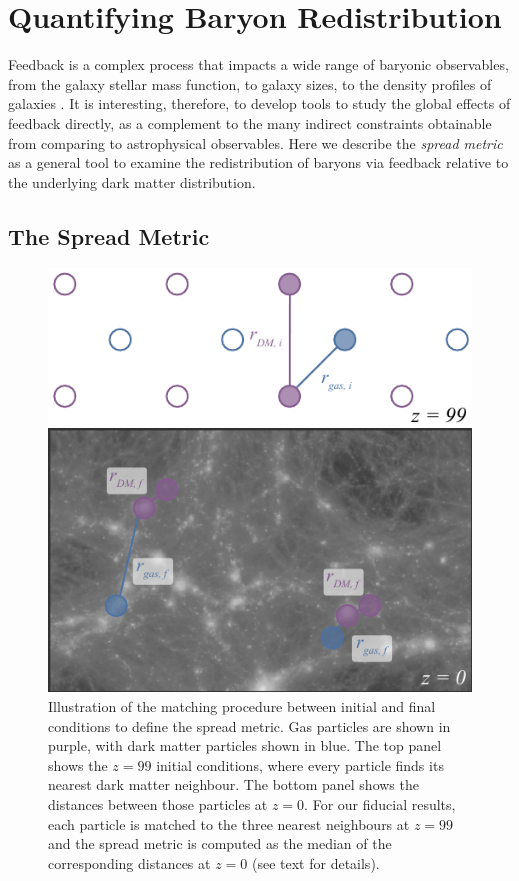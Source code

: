 \section{Quantifying Baryon Redistribution}
\label{sec:feedbackmetrics}

Feedback is a complex process that impacts a wide range of baryonic
observables, from the galaxy stellar mass function, to galaxy sizes, to the
density profiles of galaxies \citep[e.g.][]{Angles-Alcazar2014, Nelson2015,
Hellwing2016, BenitezLlambay2018}. It is interesting, therefore, to develop
tools to study the global effects of feedback directly, as a complement to
the many indirect constraints obtainable from comparing to astrophysical
observables. Here we describe the {\it spread metric} as a general tool to
examine the redistribution of baryons via feedback relative to the underlying
dark matter distribution.

\subsection{The Spread Metric}

\begin{figure}
    \centering
    \includegraphics[width=\columnwidth]{figures/kspafig_small.pdf}
    \vspace{-0.5cm}
    \caption{Illustration of the matching procedure between initial and final
    conditions to define the spread metric. Gas particles are shown in
    purple, with dark matter particles shown in blue. The top panel shows the
    $z=99$ initial conditions, where every particle finds its nearest dark
    matter neighbour. The bottom panel shows the distances between those
    particles at $z=0$. For our fiducial results, each particle is matched to
    the three nearest neighbours at $z=99$ and the spread metric is computed
    as the median of the corresponding distances at $z=0$ (see text for
    details).}
    \vspace{-0.5cm}
    \label{fig:kspafigsmall}
\end{figure}

